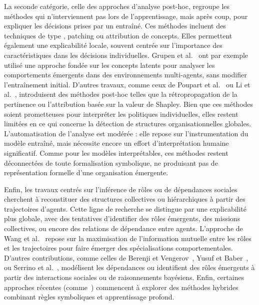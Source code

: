 La seconde catégorie, celle des approches d'analyse post-hoc, regroupe les méthodes qui n'interviennent pas lors de l'apprentissage, mais après coup, pour expliquer les décisions prises par un  entraîné. Ces méthodes incluent des techniques de type , patching ou attribution de concepts. Elles permettent également une explicabilité locale, souvent centrée sur l'importance des caractéristiques dans les décisions individuelles. Grupen et al.~\cite{grupen2022concept} ont par exemple utilisé une approche fondée sur les concepts latents pour analyser les comportements émergents dans des environnements multi-agents, sans modifier l'entraînement initial. D'autres travaux, comme ceux de Poupart et al.~\cite{poupart2025perspectives} ou Li et al.~\cite{li2025from}, introduisent des méthodes post-hoc telles que la rétropropagation de la pertinence ou l'attribution basée sur la valeur de Shapley. Bien que ces méthodes soient prometteuses pour interpréter les politiques individuelles, elles restent limitées en ce qui concerne la détection de structures organisationnelles globales. L'automatisation de l'analyse est modérée : elle repose sur l'instrumentation du modèle entraîné, mais nécessite encore un effort d'interprétation humaine significatif. Comme pour les modèles interprétables, ces méthodes restent déconnectées de toute formalisation symbolique, ne produisant pas de représentation formelle d'une organisation émergente.

Enfin, les travaux centrés sur l'inférence de rôles ou de dépendances sociales cherchent à reconstituer des structures collectives ou hiérarchiques à partir des trajectoires d'agents. Cette ligne de recherche se distingue par une explicabilité plus globale, avec des tentatives d'identifier des rôles émergents, des missions collectives, ou encore des relations de dépendance entre agents. L'approche  de Wang et al.~\cite{Wang2020} repose sur la maximisation de l'information mutuelle entre les rôles et les trajectoires pour faire émerger des spécialisations comportementales. D'autres contributions, comme celles de Berenji et Vengerov~\cite{berenji2000learning}, Yusuf et Baber~\cite{yusuf2020inferential}, ou Serrino et al.~\cite{serrino2019finding}, modélisent les dépendances ou identifient des rôles émergents à partir des interactions sociales ou de raisonnements bayésiens. Enfin, certaines approches récentes (comme~\cite{subramanian2024neurosymbolic}) commencent à explorer des méthodes hybrides combinant règles symboliques et apprentissage profond.

